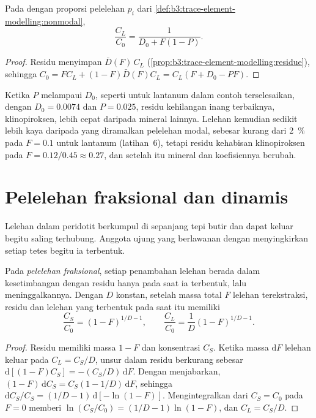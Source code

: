 \begin{proposition}\label{prop:b3:trace-element-modelling:nonmodal}
Pada  dengan proporsi pelelehan $p_i$ dari \cref{def:b3:trace-element-modelling:nonmodal},
\[
\frac{C_L}{C_0} = \frac{1}{D_0 + F(1 - P)}.
\]
\end{proposition}

\begin{proof}
Residu menyimpan $\bar D(F)\,C_L$ (\cref{prop:b3:trace-element-modelling:residue}),
sehingga $C_0 = FC_L + (1 - F)\bar D(F)C_L = C_L(F + D_0 - PF)$.
\end{proof}

Ketika $P$ melampaui $D_0$, seperti untuk lantanum dalam contoh terselesaikan, dengan $D_0 =
0.0074$ dan $P = 0.025$, residu kehilangan inang terbaiknya, klinopiroksen,
lebih cepat daripada mineral lainnya. Lelehan kemudian sedikit lebih kaya daripada
yang diramalkan pelelehan modal, sebesar kurang dari \qty{2}{\percent} pada $F = 0.1$ untuk lantanum (latihan~6), tetapi
residu kehabisan klinopiroksen pada $F = 0.12/0.45 \approx 0.27$, dan setelah
itu mineral dan koefisiennya berubah.

\section{Pelelehan fraksional dan dinamis}\label{sec:b3:trace-element-modelling:fractional}

Lelehan dalam peridotit berkumpul di sepanjang tepi butir dan dapat keluar begitu
saling terhubung. Anggota ujung yang berlawanan dengan  menyingkirkan setiap
tetes begitu ia terbentuk.

\begin{theorem}\label{thm:b3:trace-element-modelling:fractional}
Pada \emph{pelelehan fraksional}, setiap penambahan lelehan
berada dalam kesetimbangan dengan residu hanya pada saat ia terbentuk, lalu
meninggalkannya. Dengan $D$ konstan, setelah massa total $F$ lelehan terekstraksi,
residu dan lelehan yang terbentuk pada saat itu memiliki
\[
\frac{C_S}{C_0} = (1 - F)^{1/D - 1}, \qquad
\frac{C_L}{C_0} = \frac{1}{D}(1 - F)^{1/D - 1}.
\]
\end{theorem}

\begin{proof}
Residu memiliki massa $1 - F$ dan konsentrasi $C_S$. Ketika massa
$\mathrm dF$ lelehan keluar pada $C_L = C_S/D$, unsur dalam residu
berkurang sebesar $\mathrm d[(1 - F)C_S] = -(C_S/D)\,\mathrm dF$. Dengan menjabarkan,
$(1 - F)\,\mathrm dC_S = C_S(1 - 1/D)\,\mathrm dF$, sehingga
$\mathrm dC_S/C_S = (1/D - 1)\,\mathrm d[-\ln(1 - F)]$. Mengintegralkan dari
$C_S = C_0$ pada $F = 0$ memberi $\ln(C_S/C_0) = (1/D - 1)\ln(1 - F)$, dan
$C_L = C_S/D$.
\end{proof}

